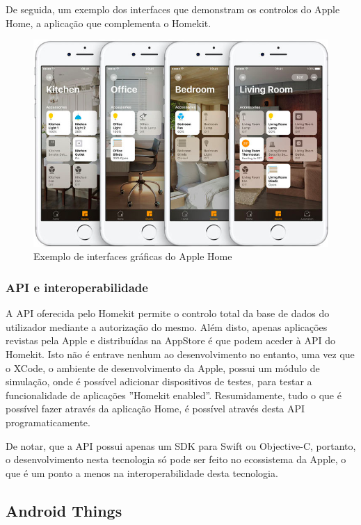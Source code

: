 De seguida, um exemplo dos interfaces que demonstram os controlos do Apple Home, a aplicação que complementa o Homekit.

\begin{figure}[H]
  \centering
        \includegraphics[scale=0.65]{img/homekit.png}
  \caption{Exemplo de interfaces gráficas do Apple Home}
\end{figure}

\subsubsection{API e interoperabilidade}

A API oferecida pelo Homekit permite o controlo total da base de dados do utilizador mediante a autorização do mesmo. Além disto, apenas aplicações revistas pela Apple e distribuídas na AppStore é que podem aceder à API do Homekit. Isto não é entrave nenhum ao desenvolvimento no entanto, uma vez que o XCode, o ambiente de desenvolvimento da Apple, possui um módulo de simulação, onde é possível adicionar dispositivos de testes, para testar a funcionalidade de aplicações ''Homekit enabled''. Resumidamente, tudo o que é possível fazer através da aplicação Home, é possível através desta API programaticamente.

De notar, que a API possui apenas um SDK para Swift ou Objective-C, portanto, o desenvolvimento nesta tecnologia só pode ser feito no ecossistema da Apple, o que é um ponto a menos na interoperabilidade desta tecnologia.

\subsection{Android Things}

